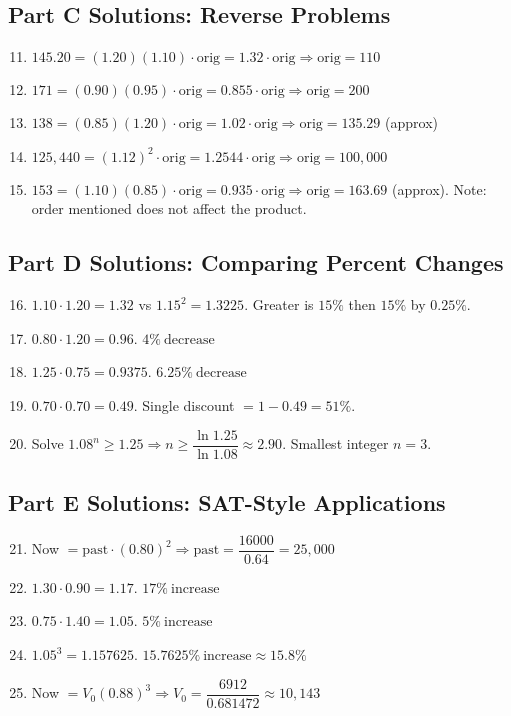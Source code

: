 \documentclass[12pt]{article}
\begin{document}
\subsection*{Part C Solutions: Reverse Problems}
\begin{enumerate}
  \setcounter{enumi}{10}
  \item \(145.20=(1.20)(1.10)\cdot \text{orig}=1.32\cdot \text{orig}\Rightarrow \text{orig}=\boxed{110}\)
  \item \(171=(0.90)(0.95)\cdot \text{orig}=0.855\cdot \text{orig}\Rightarrow \text{orig}=\boxed{200}\)
  \item \(138=(0.85)(1.20)\cdot \text{orig}=1.02\cdot \text{orig}\Rightarrow \text{orig}=\boxed{135.29}\) (approx)
  \item \(125{,}440=(1.12)^2\cdot \text{orig}=1.2544\cdot \text{orig}\Rightarrow \text{orig}=\boxed{100{,}000}\)
  \item \(153=(1.10)(0.85)\cdot \text{orig}=0.935\cdot \text{orig}\Rightarrow \text{orig}=\boxed{163.69}\) (approx). Note: order mentioned does not affect the product.
\end{enumerate}

\subsection*{Part D Solutions: Comparing Percent Changes}
\begin{enumerate}
  \setcounter{enumi}{15}
  \item \(1.10\cdot1.20=1.32\) vs \(1.15^2=1.3225\). Greater is \(15\%\) then \(15\%\) by \(0.25\%\).
  \item \(0.80\cdot1.20=0.96\). \(\boxed{4\%\ \text{decrease}}\)
  \item \(1.25\cdot0.75=0.9375\). \(\boxed{6.25\%\ \text{decrease}}\)
  \item \(0.70\cdot0.70=0.49\). Single discount \(=1-0.49=\boxed{51\%}\).
  \item Solve \(1.08^n\ge1.25\Rightarrow n\ge \dfrac{\ln 1.25}{\ln 1.08}\approx 2.90\). Smallest integer \(n=\boxed{3}\).
\end{enumerate}

\subsection*{Part E Solutions: SAT-Style Applications}
\begin{enumerate}
  \setcounter{enumi}{20}
  \item Now \(= \text{past}\cdot(0.80)^2\Rightarrow \text{past}=\dfrac{16000}{0.64}=\boxed{25{,}000}\)
  \item \(1.30\cdot0.90=1.17\). \(\boxed{17\%\ \text{increase}}\)
  \item \(0.75\cdot1.40=1.05\). \(\boxed{5\%\ \text{increase}}\)
  \item \(1.05^3=1.157625\). \(\boxed{15.7625\%\ \text{increase}}\approx \boxed{15.8\%}\)
  \item Now \(= V_0(0.88)^3\Rightarrow V_0=\dfrac{6912}{0.681472}\approx \boxed{10{,}143}\)
\end{enumerate}
\end{document}

